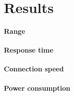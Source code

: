 \section{Results}

\paragraph{Range}

\paragraph{Response time}

\paragraph{Connection speed}

\paragraph{Power consumption}


